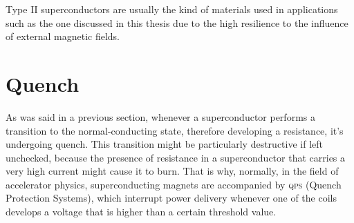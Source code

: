 Type II superconductors are usually the kind of materials used in applications such as the one
discussed in this thesis due to the high resilience to the influence of external magnetic fields.

\section{Quench}
As was said in a previous section, whenever a superconductor performs a transition to the
normal-conducting state, therefore developing a resistance, it's undergoing quench. This
transition might be particularly destructive if left unchecked, because the presence of resistance
in a superconductor that carries a very high current might cause it to burn. That is why, normally,
in the field of accelerator physics, superconducting magnets are accompanied by \textsc{qps} (Quench
Protection Systems), which interrupt power delivery whenever one of the coils develops a voltage
that is higher than a certain threshold value.
